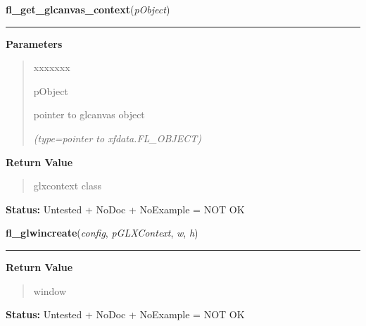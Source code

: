 \hspace{.8\funcindent}\begin{boxedminipage}{\funcwidth}

    \raggedright \textbf{fl\_get\_glcanvas\_context}(\textit{pObject})

    \vspace{-1.5ex}

    \rule{\textwidth}{0.5\fboxrule}
\setlength{\parskip}{2ex}
\setlength{\parskip}{1ex}
      \textbf{Parameters}
      \vspace{-1ex}

      \begin{quote}
        \begin{Ventry}{xxxxxxx}

          \item[pObject]

          pointer to glcanvas object

            {\it (type=pointer to xfdata.FL\_OBJECT)}

        \end{Ventry}

      \end{quote}

      \textbf{Return Value}
    \vspace{-1ex}

      \begin{quote}
      glxcontext class

      \end{quote}

\textbf{Status:} Untested + NoDoc + NoExample = NOT OK



    \end{boxedminipage}

    \label{xformslib:library:fl_glwincreate}

    \vspace{0.5ex}

\hspace{.8\funcindent}\begin{boxedminipage}{\funcwidth}

    \raggedright \textbf{fl\_glwincreate}(\textit{config}, \textit{pGLXContext}, \textit{w}, \textit{h})

    \vspace{-1.5ex}

    \rule{\textwidth}{0.5\fboxrule}
\setlength{\parskip}{2ex}
\setlength{\parskip}{1ex}
      \textbf{Return Value}
    \vspace{-1ex}

      \begin{quote}
      window

      \end{quote}

\textbf{Status:} Untested + NoDoc + NoExample = NOT OK



    \end{boxedminipage}

